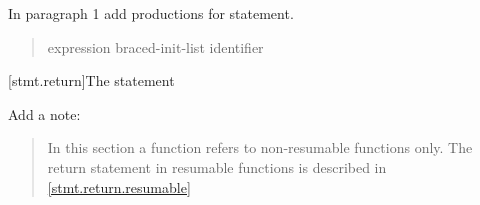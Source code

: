 In paragraph 1 add productions for  statement.

\begin{quote}
\begin{bnf}
	\br
	\br
	\br
	 expression\opt \terminal{;}\br
	 braced-init-list \terminal{;}\br
	\br
	\br
	 identifier \terminal{;}
\end{bnf}
\end{quote}

\setcounter{subsection}{2}
[stmt.return]{The  statement}%
%
%

Add a note:

\begin{quote}
\enternote
In this section a function refers to non-resumable functions only.
The return statement in resumable functions is described in \ref{stmt.return.resumable}
\exitnote
\end{quote}

